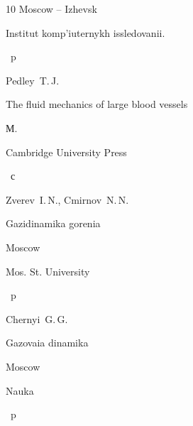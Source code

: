 \begin{thebibliography}{10}
\publaddr Moscow – Izhevsk

\publ Institut komp'iuternykh issledovanii.


~p






\by 	Pedley~T.\,J.

\book The fluid mechanics of large blood vessels

\publaddr М.

\publ Cambridge University Press


~с




\by 	Zverev~I.\,N., Cmirnov~N.\,N.

\book Gazidinamika gorenia

\publaddr Moscow

\publ Mos. St. University


~p






\by 	Chernyi~G.\,G. 

\book Gazovaia dinamika

\publaddr Moscow

\publ Nauka


~p





\end{thebibliography}



\date{12/XI/2016} %





%


%



